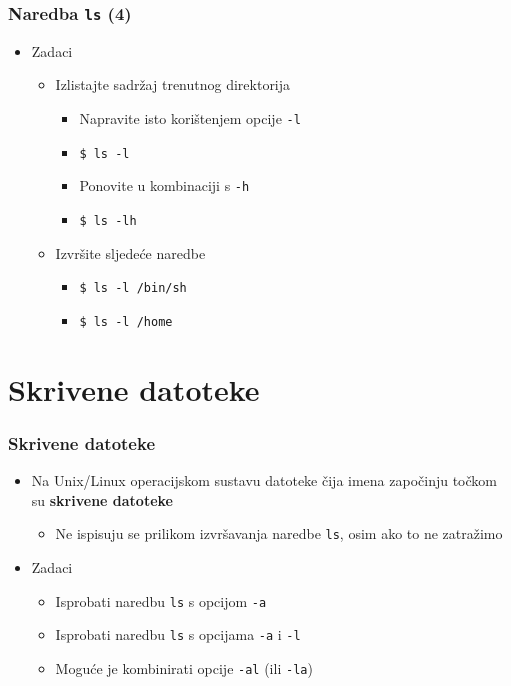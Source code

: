 \documentclass{beamer}
\begin{document}
\begin{frame}[t]
\frametitle{Naredba \texttt{ls} (4)}
\begin{itemize}
  \item Zadaci
  \begin{itemize}
    \item Izlistajte sadržaj trenutnog direktorija
    \begin{itemize}
      \item Napravite isto korištenjem opcije \texttt{-l}
      \item[] \texttt{\$ ls -l}
      \item Ponovite u kombinaciji s \texttt{-h}
      \item[] \texttt{\$ ls -lh}
    \end{itemize}
    \item Izvršite sljedeće naredbe
    \begin{itemize}
      \item[] \texttt{\$ ls -l /bin/sh}
      \item[] \texttt{\$ ls -l /home}
    \end{itemize}
  \end{itemize}
\end{itemize}
\end{frame}

\section{Skrivene datoteke}
\begin{frame}[t]
\frametitle{Skrivene datoteke}
\begin{itemize}
  \item Na Unix/Linux operacijskom sustavu datoteke čija imena započinju
        točkom su \textbf{skrivene datoteke}
  \begin{itemize}
    \item Ne ispisuju se prilikom izvršavanja naredbe \texttt{ls}, osim
          ako to ne zatražimo
  \end{itemize}
  \item Zadaci
  \begin{itemize}
    \item Isprobati naredbu \texttt{ls} s opcijom \texttt{-a}
    \item Isprobati naredbu \texttt{ls} s opcijama \texttt{-a} i \texttt{-l}
    \item Moguće je kombinirati opcije \texttt{-al} (ili \texttt{-la})
  \end{itemize}
\end{itemize}
\end{frame}
\end{document}

